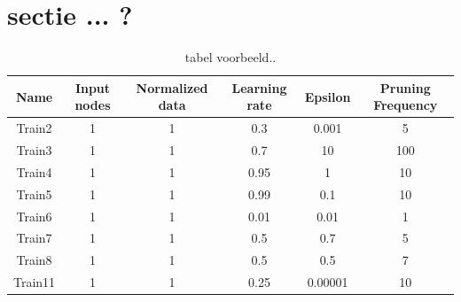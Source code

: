 \documentclass[11pt,fleqn]{book} %
\begin{document}
\section{sectie ... ?}


\begin{table}[h!]
  \centering
    \begin{tabular}{ c c c c c c }
    \hline\hline
    
    Name & Input nodes & Normalized data & Learning rate & Epsilon & Pruning Frequency\\
    \hline
    
    Train2 & 1 & 1 & 0.3 & 0.001 & 5\\
    Train3 & 1 & 1 & 0.7 & 10 & 100\\
    Train4 & 1 & 1 & 0.95 & 1 & 10\\
    Train5 & 1 & 1 & 0.99 & 0.1 & 10\\
    Train6 & 1 & 1 & 0.01 & 0.01 & 1\\
    Train7 & 1 & 1 & 0.5 & 0.7 & 5\\
    Train8 & 1 & 1 & 0.5 & 0.5 & 7\\
    Train11 & 1 & 1 & 0.25 & 0.00001 & 10\\
    
    \hline
  \end{tabular}
  \caption{tabel voorbeeld..}
  \label{tab:ds9failed}
\end{table}

\cite{book_key}

\end{document}
